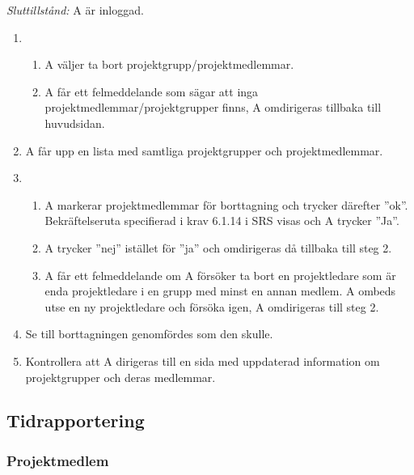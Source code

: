 \documentclass[a4paper]{article}
\begin{document}
\begin{ST}
\emph{Sluttillstånd:} A är inloggad.

\begin{enumerate}
\item 
\begin{enumerate}
\item A väljer ta bort projektgrupp/projektmedlemmar.
\item A får ett felmeddelande som sägar att inga projektmedlemmar/projektgrupper finns, A omdirigeras tillbaka till huvudsidan.
\end{enumerate}
\item A får upp en lista med samtliga projektgrupper och projektmedlemmar.
\item 
\begin{enumerate}
\item A markerar projektmedlemmar för borttagning och trycker därefter ''ok''. Bekräftelseruta specifierad i krav 6.1.14 i SRS visas och A trycker ''Ja''.
\item A trycker ''nej'' istället för ''ja'' och omdirigeras då tillbaka till steg 2.
\item A får ett felmeddelande om A försöker ta bort en projektledare som är enda projektledare i en grupp med minst en annan medlem. A ombeds utse en ny projektledare och försöka igen, A omdirigeras till steg 2.
\end{enumerate}
\item Se till borttagningen genomfördes som den skulle.
\item Kontrollera att A dirigeras till en sida med uppdaterad information om projektgrupper och deras medlemmar.
\end{enumerate}

\end{ST}




\subsection{Tidrapportering}
\subsubsection{Projektmedlem}
\end{document}
